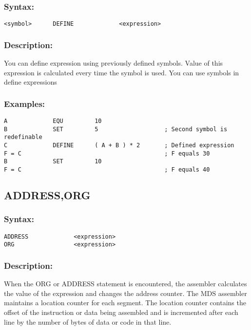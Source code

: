         \subsubsection{Syntax:}
            {
                \usecodefont
                \verb'<symbol>      DEFINE             <expression>'
            }

        \subsubsection{Description:}
            You can define expression using previously defined symbols. Value of this expression is calculated every time the symbol is used. You can use symbols in define expressions

        \subsubsection{Examples:}
            {
                \usecodefont
                \verb'A             EQU         10'\\
                \verb'B             SET         5                   ; Second symbol is redefinable'\\
                \verb'C             DEFINE      ( A + B ) * 2       ; Defined expression'\\
                \verb'F = C                                         ; F equals 30'\\
                \verb'B             SET         10'\\
                \verb'F = C                                         ; F equals 40'\\
            }

    \subsection{ADDRESS,ORG}
        \subsubsection{Syntax:}
            {
                \usecodefont
                \verb'ADDRESS             <expression>'\\
                \verb'ORG                 <expression>'
            }

        \subsubsection{Description:}
            When the ORG or ADDRESS statement is encountered, the assembler calculates the value of the expression and changes the address counter. The MDS assembler maintains a location counter for each segment. The location counter contains the offset of the instruction or data being assembled and is incremented after each line by the number of bytes of data or code in that line.

